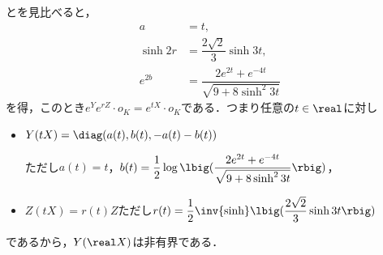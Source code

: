 \begin{npfwn}
  とを見比べると，
  \begin{align*}
    a &= t,\\
    \sinh 2r &= \dfrac{2\sqrt{2}}{3}\sinh 3t, \\
    e^{2b} &= \dfrac{2e^{2t} + e^{-4t}}{\sqrt{9 + 8\sinh^2 3t}}
  \end{align*}
  を得，このとき$e^{Y}e^{rZ}\cdot o_K = e^{tX}\cdot o_K $である．つまり任意の$t\in \real$に対し
  \begin{itemize}
  \item $Y(tX) = \diag(a(t) ,b(t) ,-a(t) -b(t) ) $

    ただし$a(t) = t$，$b(t) =\dfrac{1}{2} \log \lbig(\dfrac{2e^{2t} + e^{-4t}}{\sqrt{9 + 8\sinh^2 3t}}\rbig) $，
  \item $Z(tX) = r(t)Z  $ただし$r(t) = \dfrac{1}{2} \inv{\sinh}\lbig( \dfrac{2\sqrt{2}}{3}\sinh 3t\rbig) $
  \end{itemize}
  であるから，$Y(\real X) $は非有界である．  
\end{npfwn}
